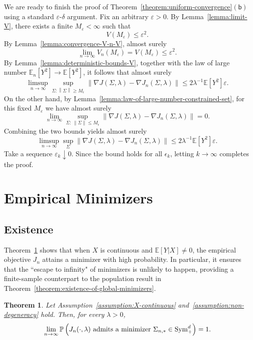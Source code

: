 \documentclass[sn-mathphys-num]{sn-jnl}%
\numberwithin{equation}{section}
\newcommand{\E}{\mathbb{E}}
\newcommand{\norm}[1]{\left\|{#1}\right\|} %
\renewcommand{\P}{\mathbb{P}}
\newcommand{\eps}{\epsilon}
\newcommand{\grad}{\nabla}
\newcommand{\Sym}{{\rm \mathrm{Sym}}}
\theoremstyle{thmstyleone}%
\newtheorem{theorem}{Theorem}%
\theoremstyle{thmstyletwo}%
\theoremstyle{thmstylethree}%
\begin{document}
We are ready to finish the proof of Theorem~\ref{theorem:uniform-convergence}$\mathsf{(b)}$ using a standard 
$\varepsilon$-$\delta$ argument.
Fix an arbitrary $\varepsilon > 0$. By Lemma~\ref{lemma:limit-V}, there exists a finite $M_\varepsilon < \infty$ such that
\[
	V(M_\varepsilon) \le \varepsilon^2.
\]
By Lemma~\ref{lemma:convergence-V-n-V}, almost surely 
\[
	\lim_{n \to \infty} V_n(M_\varepsilon) =  V(M_\varepsilon) \le \varepsilon^2.
\]
By Lemma~\ref{lemma:deterministic-bounds-V}, together with the law of large number
$\E_n[Y^2] \to \E[Y^2]$, it follows that almost surely
\[
	\limsup_{n\to \infty} \sup_{\Sigma: \norm{\Sigma} \ge M_\eps} \norm{ \grad J(\Sigma, \lambda) - \grad J_n(\Sigma, \lambda)} 
		\le 2 \lambda^{-1} \E[Y^2] \varepsilon.
\]
On the other hand, by Lemma~\ref{lemma:law-of-large-number-constrained-set}, for this fixed $M_\varepsilon$ we have almost surely
\begin{equation*}
	\lim_{n\to \infty} \sup_{\Sigma:\,\|\Sigma\| \le M_\eps} 
	\norm{ \grad J(\Sigma, \lambda) - \grad J_n(\Sigma, \lambda)} 
	= 0.
\end{equation*}
Combining the two bounds yields almost surely
\begin{equation*}
	\limsup_{n\to \infty} \sup_{\Sigma} \norm{ \grad J(\Sigma, \lambda) - \grad J_n(\Sigma, \lambda)}  \le 2 \lambda^{-1} \E[Y^2] \varepsilon.
\end{equation*}
Take a sequence $\varepsilon_k \downarrow 0$. Since the bound holds for all $\eps_k$, letting $k \to \infty$ completes the proof.

\section{Empirical Minimizers}
\label{sec:empirical-minimizers} 

\subsection{Existence}
Theorem~\ref{theorem:existence-of-global-minimizers-empirical} shows that when $X$ is continuous and $\E[Y|X] \neq 0$, the empirical objective $J_n$ attains a minimizer with high probability. In particular, it ensures that the ``escape to infinity" of minimizers is unlikely to happen, providing a finite-sample counterpart to the population result in Theorem~\ref{theorem:existence-of-global-minimizers}.


\vspace{.5em} 
\begin{theorem}
\label{theorem:existence-of-global-minimizers-empirical}
Let Assumption~\ref{assumption:X-continuous} and~\ref{assumption:non-degeneracy} hold. Then, for every $\lambda > 0$,
\begin{equation*}
	\lim_{n \to \infty} \P \left(J_n(\cdot, \lambda)~\text{admits a minimizer}~\Sigma_{n, *} \in \Sym_+^d\right) = 1.
\end{equation*}
\end{theorem}
\end{document}
